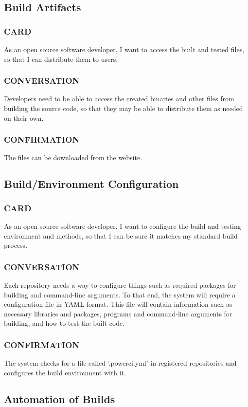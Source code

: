 \documentclass[10pt,letterpaper,onecolumn,journal]{IEEEtran}
\begin{document}
\subsection{Build Artifacts}
\subsubsection{CARD}
As an open source software developer, I want to access the built and tested files, so that I can distribute them to users.
\subsubsection{CONVERSATION}
Developers need to be able to access the created binaries and other files from building the source code, so that they may
be able to distribute them as needed on their own.
\subsubsection{CONFIRMATION}
The files can be downloaded from the website.

\subsection{Build/Environment Configuration}
\subsubsection{CARD}
As an open source software developer, I want to configure the build and testing environment and methods, so that I can be sure it matches my standard build process.
\subsubsection{CONVERSATION}
Each repository needs a way to configure things such as required packages for building and command-line arguments.
To that end, the system will require a configuration file in YAML format. This file will contain information such as necessary
libraries and packages, programs and command-line arguments for building, and how to test the built code.
\subsubsection{CONFIRMATION}
The system checks for a file called '.powerci.yml' in registered repositories and configures the build environment with it.

\subsection{Automation of Builds}
\end{document}
